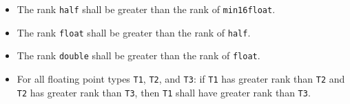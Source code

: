 
\begin{itemize}
  \item The rank \texttt{half} shall be greater than the rank of \texttt{min16float}.
  \item The rank \texttt{float} shall be greater than the rank of \texttt{half}.
  \item The rank \texttt{double} shall be greater than the rank of \texttt{float}.
  \item For all floating point types \texttt{T1}, \texttt{T2}, and \texttt{T3}:
  if \texttt{T1} has greater rank than \texttt{T2} and \texttt{T2} has greater
  rank than \texttt{T3}, then \texttt{T1} shall have greater rank than
  \texttt{T3}.
\end{itemize}
